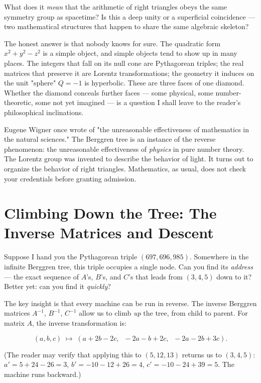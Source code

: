 What does it \textit{mean} that the arithmetic of right triangles obeys the same symmetry group as spacetime? Is this a deep unity or a superficial coincidence --- two mathematical structures that happen to share the same algebraic skeleton?

The honest answer is that nobody knows for sure. The quadratic form $x^2 + y^2 - z^2$ is a simple object, and simple objects tend to show up in many places. The integers that fall on its null cone are Pythagorean triples; the real matrices that preserve it are Lorentz transformations; the geometry it induces on the unit "sphere" $Q = -1$ is hyperbolic. These are three faces of one diamond. Whether the diamond conceals further faces --- some physical, some number-theoretic, some not yet imagined --- is a question I shall leave to the reader's philosophical inclinations.

Eugene Wigner once wrote of "the unreasonable effectiveness of mathematics in the natural sciences." The Berggren tree is an instance of the reverse phenomenon: the unreasonable effectiveness of \textit{physics} in pure number theory. The Lorentz group was invented to describe the behavior of light. It turns out to organize the behavior of right triangles. Mathematics, as usual, does not check your credentials before granting admission.


\bigskip


\section{Climbing Down the Tree: The Inverse Matrices and Descent}

Suppose I hand you the Pythagorean triple $(697, 696, 985)$. Somewhere in the infinite Berggren tree, this triple occupies a single node. Can you find its \textit{address} --- the exact sequence of $A$'s, $B$'s, and $C$'s that leads from $(3, 4, 5)$ down to it? Better yet: can you find it \textit{quickly}?

The key insight is that every machine can be run in reverse. The inverse Berggren matrices $A^{-1}$, $B^{-1}$, $C^{-1}$ allow us to climb \textit{up} the tree, from child to parent. For matrix $A$, the inverse transformation is:

\[
(a, b, c) \;\longmapsto\; (a + 2b - 2c,\;\; -2a - b + 2c,\;\; -2a - 2b + 3c).
\]

(The reader may verify that applying this to $(5, 12, 13)$ returns us to $(3, 4, 5)$: $a' = 5 + 24 - 26 = 3$, $b' = -10 - 12 + 26 = 4$, $c' = -10 - 24 + 39 = 5$. The machine runs backward.)

